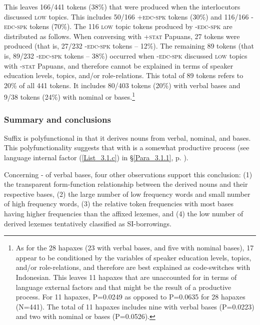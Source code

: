 This leaves 166/441 tokens (38\%) that were produced when the interlocutors discussed \textsc{low} topics. This includes 50/166 \textsc{+edc-spk} tokens (30\%) and 116/166 \textsc{-edc-spk} tokens (70\%). The 116 \textsc{low} topic tokens produced by \textsc{-edc-spk} are distributed as follows. When conversing with \textsc{+stat} Papuans, 27 tokens were produced (that is, 27/232 \textsc{-edc-spk} tokens – 12\%). The remaining 89 tokens (that is, 89/232 \textsc{-edc-spk} tokens – 38\%) occurred when \textsc{-edc-spk} discussed \textsc{low} topics with \textsc{-stat} Papuans, and therefore cannot be explained in terms of speaker education levels, topics, and/or role-relations. This total of 89 tokens refers to 20\% of all 441  tokens. It includes 80/403 tokens (20\%) with verbal bases and 9/38 tokens (24\%) with nominal or  bases.\footnote{As for the 28 hapaxes (23 with verbal bases, and five with nominal bases), 17 appear to be conditioned by the variables of speaker education levels, topics, and/or role-relations, and therefore are best explained as code-switches with Indonesian. This leaves 11 hapaxes that are unaccounted for in terms of language external factors and that might be the result of a productive  process. For 11 hapaxes, P=0.0249 as opposed to P=0.0635 for 28 hapaxes (N=441). The total of 11 hapaxes includes nine with verbal bases (P=0.0223) and two with nominal or  bases (P=0.0526).}


\subsubsection[Summary and conclusions]{Summary and conclusions}\label{Para_3.1.3.4}

Suffix  is polyfunctional in that it derives nouns from verbal, nominal, and  bases. This polyfunctionality suggests that  with  is a somewhat productive process (see language internal factor (\ref{List_3.1.c}) in §\ref{Para_3.1.1}, p. \pageref{List_3.1.c}).



Concerning - of verbal bases, four other observations support this conclusion: (1) the transparent form-function relationship between the derived nouns and their respective bases, (2) the large number of low frequency words and small number of high frequency words, (3) the relative token frequencies with most bases having higher frequencies than the affixed lexemes, and (4) the low number of derived lexemes tentatively classified as SI-borrowings.



